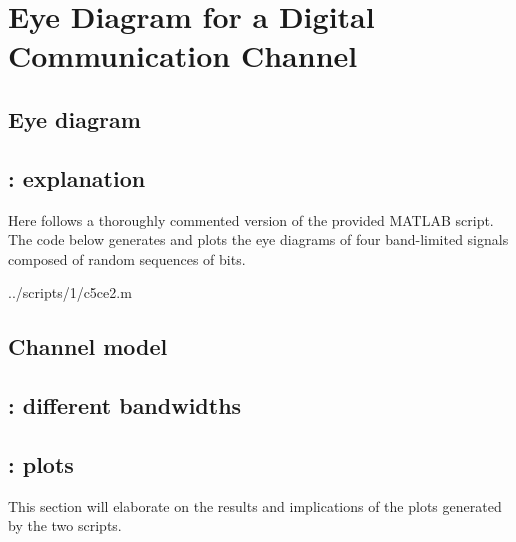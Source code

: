 \section{Eye Diagram for a Digital Communication Channel}

\subsection{Eye diagram}



\subsection{: explanation}
Here follows a thoroughly commented version of the provided  MATLAB script.
The code below generates and plots the eye diagrams of four band-limited signals composed of random sequences of bits.

\begin{lstinputlisting}[language=Octave]{../scripts/1/c5ce2.m}
\end{lstinputlisting}


\subsection{Channel model}



\subsection{: different bandwidths}



\subsection{: plots}
This section will elaborate on the results and implications of the plots generated by the two scripts.



